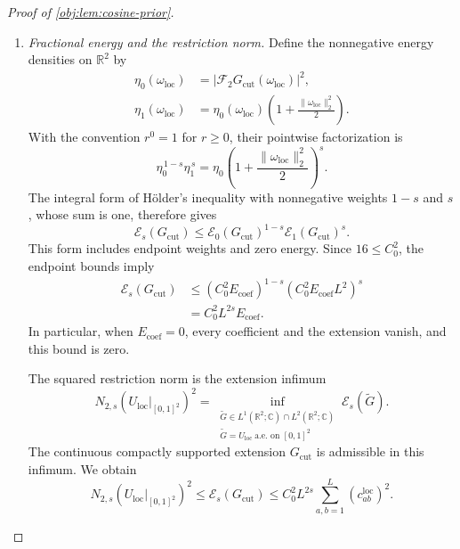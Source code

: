 \begin{proof}[Proof of \cref{obj:lem:cosine-prior}]
\begin{enumerate}
\item \emph{Fractional energy and the restriction norm.}
Define the nonnegative energy densities on \(\mathbb R^2\) by
\[
\begin{aligned}
\eta_0(\omega_{\mathrm{loc}})
&=|\mathcal F_2G_{\mathrm{cut}}(\omega_{\mathrm{loc}})|^2,\\
\eta_1(\omega_{\mathrm{loc}})
&=\eta_0(\omega_{\mathrm{loc}})
 \left(1+\frac{\|\omega_{\mathrm{loc}}\|_2^2}{2}\right).
\end{aligned}
\]
With the convention \(r^0=1\) for \(r\geq0\), their pointwise factorization is
\[
\eta_0^{\,1-s}\eta_1^{\,s}
=\eta_0
 \left(1+\frac{\|\omega_{\mathrm{loc}}\|_2^2}{2}\right)^s.
\]
The integral form of Hölder's inequality with nonnegative weights
\(1-s\) and \(s\), whose sum is one, therefore gives
\[
\mathcal E_s(G_{\mathrm{cut}})
\leq
\mathcal E_0(G_{\mathrm{cut}})^{1-s}
\mathcal E_1(G_{\mathrm{cut}})^s.
\]
This form includes endpoint weights and zero energy. Since
\(16\leq C_0^2\), the endpoint bounds imply
\[
\begin{aligned}
\mathcal E_s(G_{\mathrm{cut}})
&\leq
 (C_0^2E_{\mathrm{coef}})^{1-s}
 (C_0^2E_{\mathrm{coef}}L^2)^s\\
&=C_0^2L^{2s}E_{\mathrm{coef}}.
\end{aligned}
\]
In particular, when \(E_{\mathrm{coef}}=0\), every coefficient and the
extension vanish, and this bound is zero.

The squared restriction norm is the extension infimum
\[
N_{2,s}(U_{\mathrm{loc}}|_{[0,1]^2})^2
=
\inf_{\substack{
 \widetilde G\in L^1(\mathbb R^2;\mathbb C)\cap L^2(\mathbb R^2;\mathbb C)\\
 \widetilde G=U_{\mathrm{loc}}\ \text{a.e.\ on }[0,1]^2}}
 \mathcal E_s(\widetilde G).
\]
The continuous compactly supported extension \(G_{\mathrm{cut}}\) is
admissible in this infimum. We obtain
\[
N_{2,s}(U_{\mathrm{loc}}|_{[0,1]^2})^2
\leq
\mathcal E_s(G_{\mathrm{cut}})
\leq C_0^2L^{2s}
 \sum_{a,b=1}^L(c^{\mathrm{loc}}_{ab})^2.
\]


\end{enumerate}
\end{proof}
